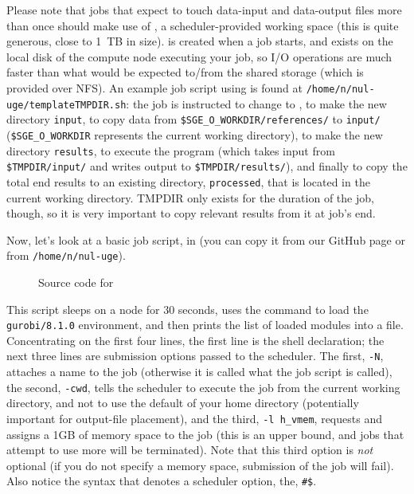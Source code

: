 \documentclass{easychair}
\begin{document}
Please note that jobs that expect to touch data-input and data-output files
more than once should make use of , a scheduler-provided working
space (this is quite generous, close to 1~TB in size).  is created
when a job starts, and exists on the local disk of the compute node
executing your job, so I/O operations are much faster than what would be
expected to/from the shared storage (which is provided over NFS). An
example job script using  is found at
\texttt{/home/n/nul-uge/templateTMPDIR.sh}: the job is instructed to change to
, to make the new directory \texttt{input}, to copy data from
\texttt{\$SGE\_O\_WORKDIR/references/} to \texttt{input/} (\texttt{\$SGE\_O\_WORKDIR} represents the
current working directory), to make the new directory \texttt{results}, to
execute the program (which takes input from \texttt{\$TMPDIR/input/} and writes
output to \texttt{\$TMPDIR/results/}), and finally to copy the total end results
to an existing directory, \texttt{processed}, that is located in the current
working directory. TMPDIR only exists for the duration of the job, though,
so it is very important to copy relevant results from it at job's end.

Now, let's look at a basic job script,  in 
(you can copy it from our GitHub page or from \texttt{/home/n/nul-uge}).

\begin{figure}[htpb]
    
    \caption{Source code for }
	\label{fig:tcsh.sh}
\end{figure}

This script sleeps on a node for 30 seconds, uses the 
 command to load the \texttt{gurobi/8.1.0} 
environment, and then prints the list of loaded modules 
into a file. Concentrating on the first 
four lines, the first line is the shell declaration; the next three 
lines are submission options passed to the scheduler. 
The first, \texttt{-N}, attaches a name to the job (otherwise it is 
called what the job script is called), the second, \texttt{-cwd},
tells the scheduler to execute the job from the current working 
directory, and not to use the default of your home directory (potentially 
important for output-file placement), and the third, \texttt{-l h\_vmem}, 
requests and assigns a 1GB of memory space to the job (this is an upper bound, and 
jobs that attempt to use more will be terminated). Note that this third 
option is \emph{not} optional (if you do not specify a memory space, 
submission of the job will fail). Also notice the syntax that denotes a 
scheduler option, the, \texttt{\#\$}.
\end{document}
